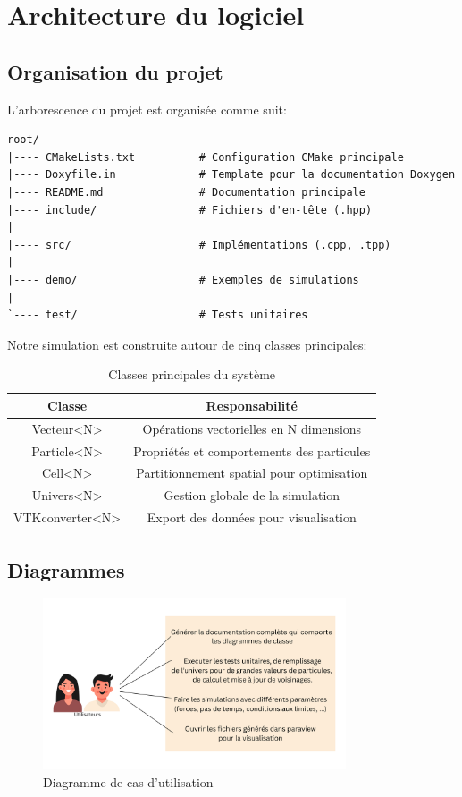 \documentclass[12pt,a4paper]{article}
\begin{document}
\section{Architecture du logiciel}

\subsection{Organisation du projet}

L'arborescence du projet est organisée comme suit:

\begin{verbatim}
root/
|---- CMakeLists.txt          # Configuration CMake principale
|---- Doxyfile.in             # Template pour la documentation Doxygen
|---- README.md               # Documentation principale
|---- include/                # Fichiers d'en-tête (.hpp)
|
|---- src/                    # Implémentations (.cpp, .tpp)
|
|---- demo/                   # Exemples de simulations
|
`---- test/                   # Tests unitaires
\end{verbatim}


Notre simulation est construite autour de cinq classes principales:

\begin{table}[H]
\centering
\begin{tabular}{|c|c|}
\hline
\textbf{Classe} & \textbf{Responsabilité} \\
\hline
Vecteur<N> & Opérations vectorielles en N dimensions \\
\hline
Particle<N> & Propriétés et comportements des particules \\
\hline
Cell<N> & Partitionnement spatial pour optimisation \\
\hline
Univers<N> & Gestion globale de la simulation \\
\hline
VTKconverter<N> & Export des données pour visualisation \\
\hline
\end{tabular}
\caption{Classes principales du système}
\end{table}

\subsection{Diagrammes}

\begin{figure}[H]
\centering
\includegraphics[width=0.8\textwidth]{assets/diagrammeCasUtilisation.png}
\caption{Diagramme de cas d'utilisation}
\end{figure}
\end{document}
